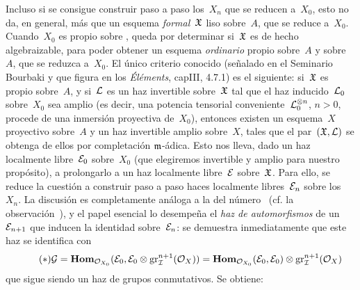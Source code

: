 Incluso si se consigue construir paso a paso los~$X_n$ que se reducen a~$X_0$, esto no da, en general, más que un esquema \emph{formal}~$\goth{X}$ liso sobre~$A$, que se reduce a~$X_0$. Cuando~$X_0$ es propio sobre
, queda por determinar si~$\goth{X}$ es de hecho algebraizable, para poder obtener un esquema \emph{ordinario} propio sobre~$A$ y
sobre~$A$, que se reduzca a~$X_0$. El único criterio conocido (señalado en el Seminario Bourbaki y que figura en los \emph{Éléments}, cap\ptbl III, 4.7.1) es el siguiente: si~$\goth{X}$ es propio sobre~$A$, y si~$\cal{L}$ es un haz invertible sobre~$\goth{X}$ tal que el haz inducido~$\cal{L}_0$ sobre~$X_0$ sea amplio (es decir, una potencia tensorial conveniente~$\cal{L}_0^{\otimes n}$, $n>0$, procede de una inmersión proyectiva de~$X_0$), entonces existen un esquema~$X$ proyectivo sobre~$A$ y un haz invertible amplio sobre~$X$, tales que el par~$(\goth{X},\cal{L})$ se obtenga de ellos por completación $\goth{m}$-ádica. Esto nos lleva, dado un haz localmente libre~$\cal{E}_0$ sobre~$X_0$ (que elegiremos invertible y amplio para nuestro propósito), a prolongarlo a un haz localmente libre~$\cal{E}$ sobre~$\goth{X}$. Para ello, se reduce la cuestión a construir paso a paso haces localmente libres~$\cal{E}_n$ sobre los~$X_n$. La discusión es completamente análoga a la del número~ (cf. la observación~), y el papel esencial lo desempeña el \emph{haz de automorfismos} de un~$\cal{E}_{n+1}$ que inducen la identidad sobre~$\cal{E}_n$: se demuestra inmediatamente que este haz se identifica con
\begin{equation*}
\label{eq:III.7.*}\tag{$*$}{}
\cal{G}=\SheafHom_{\cal{O}_{X_0}}(\cal{E}_0,
\cal{E}_0\otimes\gr_{\cal{I}}^{n+1}(\cal{O}_X))=
\SheafHom_{\cal{O}_{X_0}}(\cal{E}_0,
\cal{E}_0)\otimes\gr_{\cal{I}}^{n+1}(\cal{O}_X)
\end{equation*}
que sigue siendo un haz de grupos conmutativos. Se obtiene:
